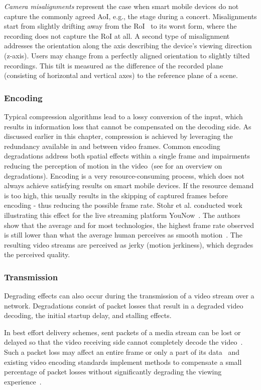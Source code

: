 \emph{Camera misalignments} represent the case when smart mobile devices do not capture the commonly agreed \ac{AoI}, e.g., the stage during a concert.
Misalignments start from slightly drifting away from the \ac{RoI}~\cite{Bowen2013} to its worst form, where the recording does not capture the \ac{RoI} at all. 
A second type of misalignment addresses the orientation along the axis describing the device's viewing direction (z-axis). 
Users may change from a perfectly aligned orientation to slightly tilted recordings.
This tilt is measured as the difference of the recorded plane (consisting of horizontal and vertical axes) to the reference plane of a scene.  

\subsubsection{Encoding}
Typical compression algorithms lead to a lossy conversion of the input, which results in information loss that cannot be compensated on the decoding side.
As discussed earlier in this chapter, compression is achieved by leveraging the redundancy available in and between video frames.
Common encoding degradations address both spatial effects within a single frame and impairments reducing the perception of motion in the video~(see \cite{Jang2016,TaoLiu2010} for an overview on degradations). 
Encoding is a very resource-consuming process, which does not always achieve satisfying results on smart mobile devices.
If the resource demand is too high, this usually results in the skipping of captured frames before encoding - thus reducing the possible frame rate.
Stohr et al. conducted work illustrating this effect for the live streaming platform YouNow~\cite{Stohr2015}.
The authors show that the average and for most technologies, the highest frame rate observed is still lower than what the average human perceives as smooth motion~\cite{Kandel2013}. 
The resulting video streams are perceived as jerky (motion jerkiness), which degrades the perceived quality. 
\subsubsection{Transmission}
Degrading effects can also occur during the transmission of a video stream over a network.
Degradations consist of packet losses that result in a degraded video decoding, the initial startup delay, and \ac{stalling} effects.

In best effort delivery schemes, sent packets of a media stream can be lost or delayed so that the video receiving side cannot completely decode the video~\cite{Dialogic2009}.
Such a packet loss may affect an entire frame or only a part of its data~\cite{TaoLiu2010} and existing video encoding standards implement methods to compensate a small percentage of packet losses without significantly degrading the viewing experience~\cite{Sullivan2012,Wiegand2003}.

